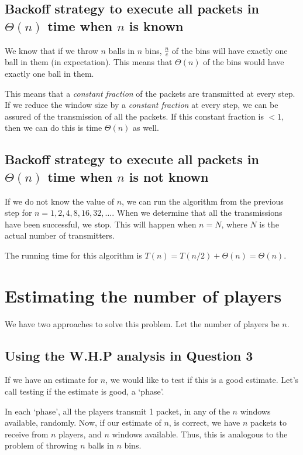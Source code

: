 \documentclass{article}
\begin{document}
\subsection{Backoff strategy to execute all packets in $\Theta(n)$ time when $n$ is \textbf{known}}

We know that if we throw $n$ balls in $n$ bins, $\frac{n}{e}$ of the
bins will have exactly one ball in them (in expectation). This means
that $\Theta(n)$ of the bins would have exactly one ball in them.

This means that a \textit{constant fraction} of the packets are
transmitted at every step. If we reduce the window size by a
\textit{constant fraction} at every step, we can be assured of the
transmission of all the packets. If this constant fraction is $< 1$,
then we can do this is time $\Theta(n)$ as well.

\subsection{Backoff strategy to execute all packets in $\Theta(n)$ time when $n$ is \textbf{not known}}

If we do not know the value of $n$, we can run the algorithm from the
previous step for $n = 1, 2, 4, 8, 16, 32, \ldots{}$. When we
determine that all the transmissions have been successful, we
stop. This will happen when $n = N$, where $N$ is the actual number of
transmitters.

The running time for this algorithm is $T(n) = T(n/2) + \Theta(n) =
\Theta(n)$.

\clearpage

\section{Estimating the number of players}
We have two approaches to solve this problem. Let the number of 
players be $n$.

\subsection{Using the W.H.P analysis in Question 3}
If we have an estimate for $n$, we would like to test if this is a good
estimate. Let's call testing if the estimate is good, a `phase'.

In each `phase', all the players transmit 1 packet, in any of the
$n$ windows available, randomly. Now, if our estimate of $n$, is correct,
we have $n$ packets to receive from $n$ players, and $n$ windows available.
Thus, this is analogous to the problem of throwing $n$ balls in $n$ bins.
\end{document}
